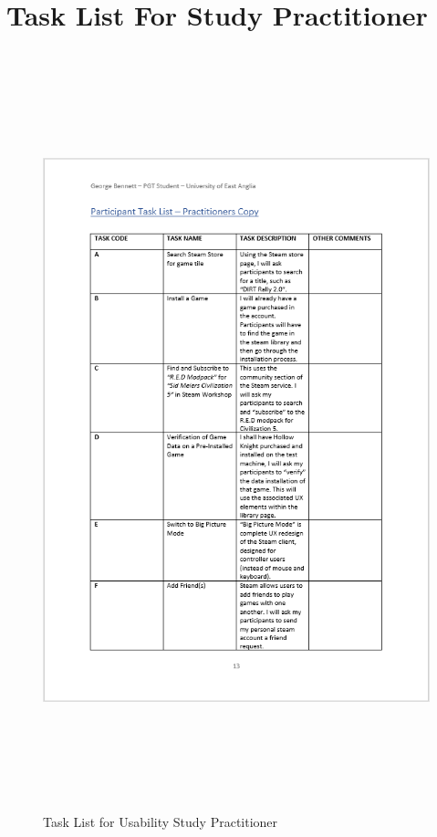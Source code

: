 \section{Task List For Study Practitioner}
\begin{figure}[H]
\includegraphics[width=16cm,height=22cm]{Screenshots/StudyMaterialScreenshots/tasklistPractioners.png}
\caption{Task List for Usability Study Practitioner}
\end{figure}

